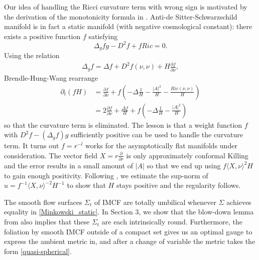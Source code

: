 \documentclass[12pt,twoside]{article}
\theoremstyle{plain}
\theoremstyle{definition}
\theoremstyle{remark}
\newcommand{\pl}{\partial}
\newcommand{\lt}{\left}
\newcommand{\rt}{\right}
\numberwithin{equation}{section}
\begin{document}
Our idea of handling the Ricci curvature term with wrong sign is motivated by the derivation of the monotonicity formula in \cite{BHW}. Anti-de Sitter-Schwarzschild manifold is in fact a static manifold (with negative cosmological constant): there exists a positive function $f$ satisfying 
\[ \Delta_g f g - D^2 f + f Ric =0. \]
Using the relation
\begin{align*}
\Delta_g f = \Delta f + D^2 f (\nu,\nu) + H \frac{\pl f}{\pl \nu}, 
\end{align*}
Brendle-Hung-Wang rearrange 
\begin{align*}
\pl_t (fH) &= \frac{\pl f}{\pl\nu} + f \lt( -\Delta \frac{1}{H} - \frac{|A|^2}{H} - \frac{Ric(\nu,\nu)}{H} \rt) \\
&= 2 \frac{\pl f}{\pl\nu} + \frac{\Delta f}{H} + f \lt( -\Delta\frac{1}{H} - \frac{|A|^2}{H} \rt)
\end{align*}
so that the curvature term is eliminated. The lesson is that a weight function $f$ with $D^2 f -(\Delta_g f)g$ sufficiently positive can be used to handle the curvature term. It turns out $f = r^{-l}$ works for the asymptotically flat manifolds under consideration. The vector field $X = r \frac{\pl}{\pl r}$ is only approximately conformal Killing and the error results in a small amount of $|A|$ so that we end up using $f \langle X,\nu \rangle^2 H$ to gain enough positivity. Following \cite{HI2}, we estimate the sup-norm of $u = f^{-1} \langle X,\nu \rangle^{-2} H^{-1}$ to show that $H$ stays positive and the regularity follows. 

The smooth flow surfaces $\Sigma_{t}$ of IMCF are totally umbilical whenever $\Sigma$ achieves equality in \eqref{Minkowski_static}. In Section 3, we show that the blow-down lemma from \cite{HI} also implies that these $\Sigma_{t}$ are each intrinsically round. Furthermore, the foliation by smooth IMCF outside of a compact set gives us an optimal gauge to express the ambient metric in, and after a change of variable the metric takes the form \eqref{quasi-spherical}.
\end{document}
